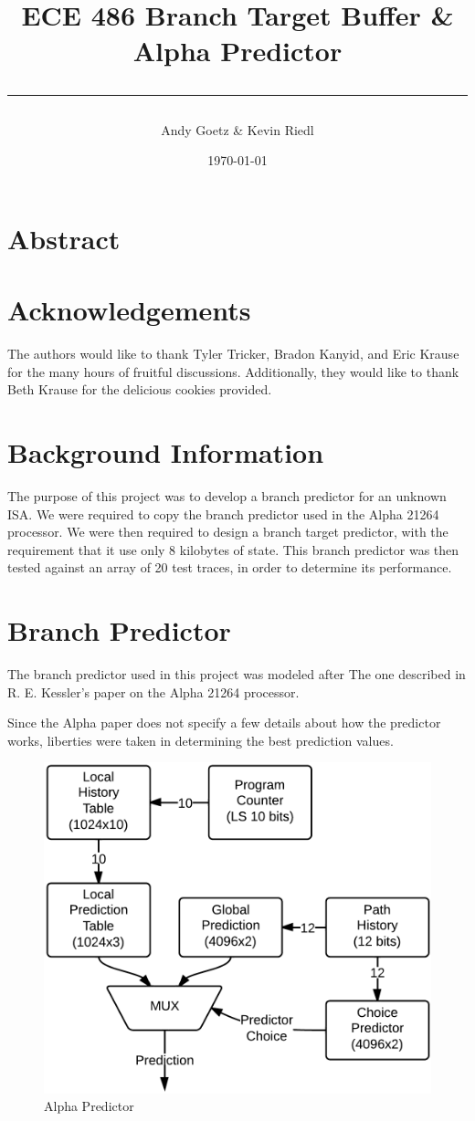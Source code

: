 \documentclass[twocolumn]{article}
\author{\LARGE Andy Goetz \& Kevin Riedl}
\date{\today}
\title{\Huge \textbf{ECE 486 Branch Target Buffer \& Alpha Predictor} \\ \rule{\linewidth}{0.5mm}}
\newcommand{\centerimage}[3]{
\begin{figure}[ht!]  
\begin{center} #1
\caption{#2}
\label{#3}
\end{center}
\end{figure}}
\begin{document}
\maketitle
\section{Abstract}
\section{Acknowledgements}

The authors would like to thank Tyler Tricker, Bradon Kanyid, and Eric
Krause for the many hours of fruitful discussions. Additionally, they
would like to thank Beth Krause for the delicious cookies provided.

\section{Background Information}
The purpose of this project was to develop a branch predictor for an
unknown ISA. We were required to copy the branch predictor used in the
Alpha 21264 processor. We were then required to design a branch target
predictor, with the requirement that it use only 8 kilobytes of
state. This branch predictor was then tested against an array of 20
test traces, in order to determine its performance. 


\section{Branch Predictor}
The branch predictor used in this project was modeled after
The one described in R. E. Kessler's paper on the Alpha 
21264 processor. 

Since the Alpha paper does not specify a few details about how the predictor
works, liberties were taken in determining the best prediction values. 

\centerimage{\includegraphics[width=\columnwidth]{AlphaPredictor.png}}{Alpha Predictor}{Alpha}
\end{document}
